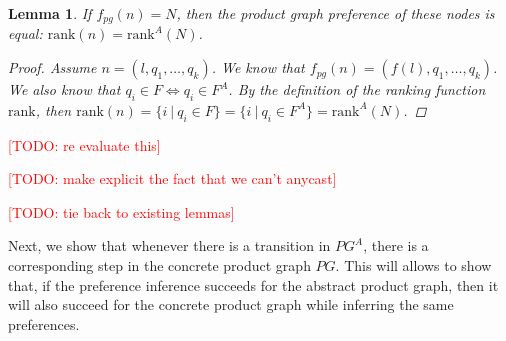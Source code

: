 \documentclass[twocolumn, openany]{sig-alternate-10pt}
\newcommand{\todo}[1]{\textcolor{red}{[TODO: #1]}}
\newcommand{\Rank}{\ensuremath{\mathrm{rank}}}
\newtheorem{lem}[thm]{Lemma}
\begin{document}
\begin{lem}
  If $f_{pg}(n) = N$, then the product graph preference of these nodes is equal: $\Rank(n) = \Rank^A(N)$.

  \begin{proof}
    Assume $n = (l,q_1,\dots,q_k)$. We know that $f_{pg}(n) = (f(l),q_1,\dots,q_k)$. 
    We also know that $q_i \in F \iff q_i \in F^A$. 
    By the definition of the ranking function $\Rank$, then 
    $\Rank(n) = \{ i ~\vert~ q_i \in F \} = \{ i ~\vert~ q_i \in F^A \} = \Rank^A(N)$.
  \end{proof}

\end{lem}



%


\todo{re evaluate this}

\todo{make explicit the fact that we can't anycast}

\todo{tie back to existing lemmas}


\vspace{1em}

Next, we show that whenever there is a transition in $PG^A$, there is a corresponding step in the concrete product graph $PG$. This will allows to show that, if the preference inference succeeds for the abstract product graph, then it will also succeed for the concrete product graph while inferring the same preferences.
\end{document}
